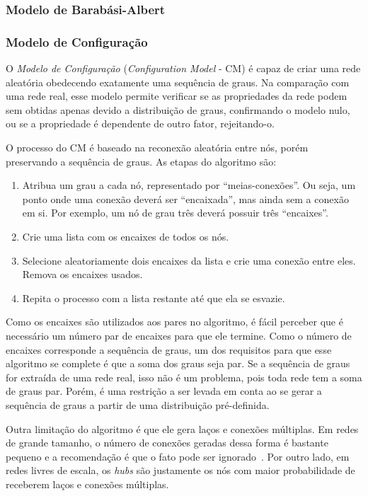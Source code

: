 \documentclass[12pt,a4paper]{article}
\theoremstyle{hypo}
\begin{document}
\subsubsection{Modelo de Barabási-Albert} \label{sec:modelo-barabasi-albert}

\subsubsection{Modelo de Configuração} \label{sec:modelo-configuracao}

O \textit{Modelo de Configuração} (\textit{Configuration Model} - CM) é capaz de criar uma rede aleatória obedecendo exatamente uma sequência de graus. Na comparação com uma rede real, esse modelo permite verificar se as propriedades da rede podem sem obtidas apenas devido a distribuição de graus, confirmando o modelo nulo, ou se a propriedade é dependente de outro fator, rejeitando-o.

O processo do CM é baseado na reconexão aleatória entre nós, porém preservando a sequência de graus. As etapas do algoritmo são:

\begin{enumerate}
\item Atribua um grau a cada nó, representado por \enquote{meias-conexões}. Ou seja, um ponto onde uma conexão deverá ser \enquote{encaixada}, mas ainda sem a conexão em si. Por exemplo, um nó de grau três deverá possuir três \enquote{encaixes}.
\item Crie uma lista com os encaixes de todos os nós.
\item Selecione aleatoriamente dois encaixes da lista e crie uma conexão entre eles. Remova os encaixes usados.
\item Repita o processo com a lista restante até que ela se esvazie.
\end{enumerate}

Como os encaixes são utilizados aos pares no algoritmo, é fácil perceber que é necessário um número par de encaixes para que ele termine. Como o número de encaixes corresponde a sequência de graus, um dos requisitos para que esse algoritmo se complete é que a soma dos graus seja par. Se a sequência de graus for extraída de uma rede real, isso não é um problema, pois toda rede tem a soma de graus par. Porém, é uma restrição a ser levada em conta ao se gerar a sequência de graus a partir de uma distribuição pré-definida.

Outra limitação do algoritmo é que ele gera laços e conexões múltiplas. Em redes de grande tamanho, o número de conexões geradas dessa forma é bastante pequeno e a recomendação é que o fato pode ser ignorado~\cite{Barabasi2016-rn}. Por outro lado, em redes livres de escala, os \textit{hubs} são justamente os nós com maior probabilidade de receberem laços e conexões múltiplas.
\end{document}
